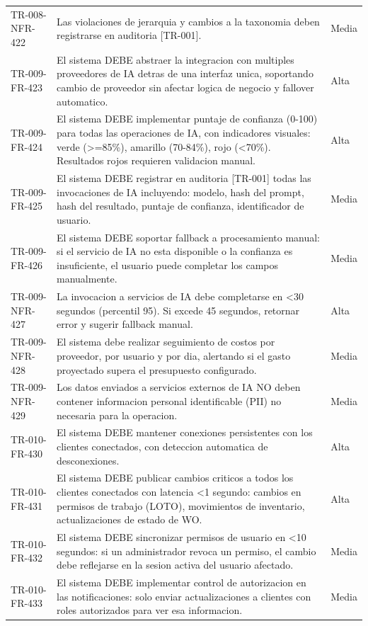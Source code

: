 \begin{longtable}{>{\raggedright\arraybackslash}p{} >{\raggedright\arraybackslash}p{} >{\raggedright\arraybackslash}p{}}
TR-008-NFR-422 & Las violaciones de jerarquia y cambios a la taxonomia deben registrarse en auditoria [TR-001]. & Media \\
TR-009-FR-423 & El sistema DEBE abstraer la integracion con multiples proveedores de IA detras de una interfaz unica, soportando cambio de proveedor sin afectar logica de negocio y fallover automatico. & Alta \\
TR-009-FR-424 & El sistema DEBE implementar puntaje de confianza (0-100) para todas las operaciones de IA, con indicadores visuales: verde (>=85\%), amarillo (70-84\%), rojo (<70\%). Resultados rojos requieren validacion manual. & Alta \\
TR-009-FR-425 & El sistema DEBE registrar en auditoria [TR-001] todas las invocaciones de IA incluyendo: modelo, hash del prompt, hash del resultado, puntaje de confianza, identificador de usuario. & Media \\
TR-009-FR-426 & El sistema DEBE soportar fallback a procesamiento manual: si el servicio de IA no esta disponible o la confianza es insuficiente, el usuario puede completar los campos manualmente. & Media \\
TR-009-NFR-427 & La invocacion a servicios de IA debe completarse en <30 segundos (percentil 95). Si excede 45 segundos, retornar error y sugerir fallback manual. & Alta \\
TR-009-NFR-428 & El sistema debe realizar seguimiento de costos por proveedor, por usuario y por dia, alertando si el gasto proyectado supera el presupuesto configurado. & Media \\
TR-009-NFR-429 & Los datos enviados a servicios externos de IA NO deben contener informacion personal identificable (PII) no necesaria para la operacion. & Media \\
TR-010-FR-430 & El sistema DEBE mantener conexiones persistentes con los clientes conectados, con deteccion automatica de desconexiones. & Alta \\
TR-010-FR-431 & El sistema DEBE publicar cambios criticos a todos los clientes conectados con latencia <1 segundo: cambios en permisos de trabajo (LOTO), movimientos de inventario, actualizaciones de estado de WO. & Alta \\
TR-010-FR-432 & El sistema DEBE sincronizar permisos de usuario en <10 segundos: si un administrador revoca un permiso, el cambio debe reflejarse en la sesion activa del usuario afectado. & Media \\
TR-010-FR-433 & El sistema DEBE implementar control de autorizacion en las notificaciones: solo enviar actualizaciones a clientes con roles autorizados para ver esa informacion. & Media \\

\end{longtable}
